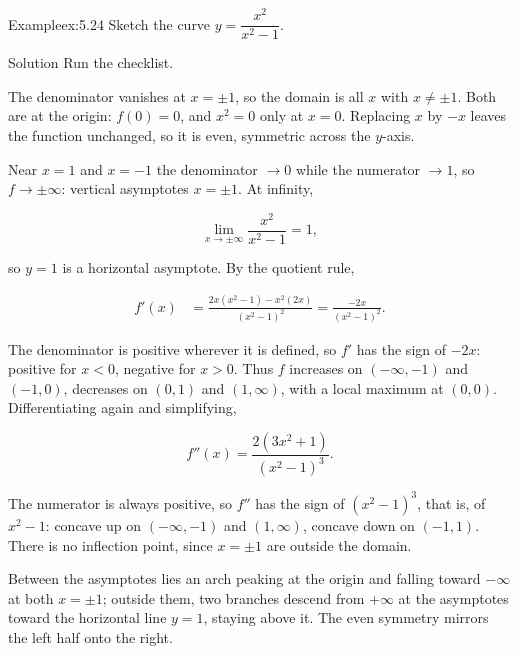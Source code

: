 \documentclass[a4paper,12pt,oneside]{memoir}
\begin{document}
\begin{workedexample}
\begin{envexample}{Example}{ex:5.24}{}
Sketch the curve \(y = \dfrac{x^{2}}{x^{2} - 1}\).
\end{envexample}
\begin{envsolution}{Solution}{}{}
Run the checklist.

 The denominator vanishes at \(x = \pm 1\), so the domain is all \(x\) with \(x \ne \pm 1\).  Both are at the origin: \(f(0) = 0\), and \(x^{2} = 0\) only at \(x = 0\).  Replacing \(x\) by \(-x\) leaves the function unchanged, so it is even, symmetric across the \(y\)-axis.

 Near \(x = 1\) and \(x = -1\) the denominator \(\to 0\) while the numerator \(\to 1\), so \(f \to \pm\infty\): vertical asymptotes \(x = \pm 1\). At infinity,

\[ \lim_{x \to \pm\infty} \frac{x^{2}}{x^{2} - 1} = 1, \]

so \(y = 1\) is a horizontal asymptote.  By the quotient rule,

\[ \begin{aligned}
          f'(x) &= \frac{2x(x^{2} - 1) - x^{2}(2x)}{(x^{2} - 1)^{2}} = \frac{-2x}{(x^{2} - 1)^{2}}.
        \end{aligned} \]

The denominator is positive wherever it is defined, so \(f'\) has the sign of \(-2x\): positive for \(x < 0\), negative for \(x > 0\). Thus \(f\) increases on \((-\infty, -1)\) and \((-1, 0)\), decreases on \((0, 1)\) and \((1, \infty)\), with a local maximum at \((0, 0)\).  Differentiating again and simplifying,

\[ f''(x) = \frac{2(3x^{2} + 1)}{(x^{2} - 1)^{3}}. \]

The numerator is always positive, so \(f''\) has the sign of \((x^{2} - 1)^{3}\), that is, of \(x^{2} - 1\): concave up on \((-\infty, -1)\) and \((1, \infty)\), concave down on \((-1, 1)\). There is no inflection point, since \(x = \pm 1\) are outside the domain.

 Between the asymptotes lies an arch peaking at the origin and falling toward \(-\infty\) at both \(x = \pm 1\); outside them, two branches descend from \(+\infty\) at the asymptotes toward the horizontal line \(y = 1\), staying above it. The even symmetry mirrors the left half onto the right. \qedmark
\end{envsolution}
\end{workedexample}
\end{document}
